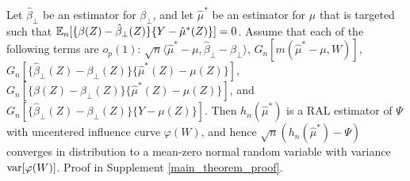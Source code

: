 



\begin{theorem}
    \label{main_theorem}
    Let $\hat{\beta}_\perp$ be an estimator for $\beta_\perp$, and let $\hat{\mu}^*$ be an estimator for $\mu$ that is targeted such that $\mathbb{E}_n[\{\beta(Z) - \hat{\beta}_\perp(Z)\}\{Y - \hat{\mu}^*(Z)\}] = 0$. Assume that each of the following terms are $o_p(1)$: $\sqrt{n}\langle \hat{\mu}^* - \mu , \hat{\beta}_{\perp}  - \beta_\perp\rangle$, $G_n[m(\hat{\mu}^* - \mu, W)]$, $G_n\left[\{\hat{\beta}_\perp(Z) - \beta_\perp(Z)\}\{\hat{\mu}^*(Z) - \mu(Z)\}\right]$, $G_n\left[\{\beta(Z) - \beta_\perp(Z)\}\{\hat{\mu}^*(Z) - \mu(Z)\}\right]$, and $G_n\left[\{\hat{\beta}_\perp(Z) - \beta_\perp(Z)\}\{Y - \mu(Z)\}\right]$.
    Then $h_n(\hat{\mu}^*)$ is a RAL estimator of $\Psi$ with uncentered influence curve $\varphi(W)$, and hence $\sqrt{n}(h_n(\hat{\mu}^*)-\Psi)$ converges in distribution to a mean-zero normal random variable with variance $\mathrm{var}[\varphi(W)]$. Proof in Supplement \ref{main_theorem_proof}.
\end{theorem}








